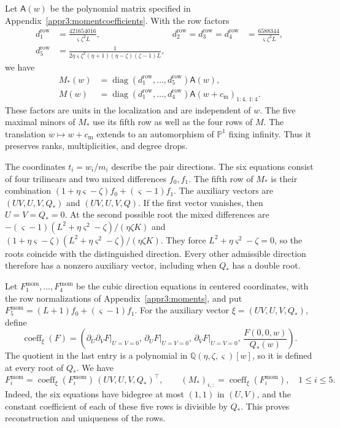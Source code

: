 \documentclass[11pt,a4paper]{article}
\numberwithin{equation}{section}
\theoremstyle{plain}
\theoremstyle{definition}
\theoremstyle{remark}
\begin{document}
Let $\mathsf A(w)$ be the polynomial matrix specified in
Appendix~\ref{appr3:momentcoefficients}. With the row factors
\begin{align*}
 d_{1}^{\mathrm{row}}&=\frac{421654016}{\varsigma \zeta ^2L},&
 d_{2}^{\mathrm{row}}=d_{3}^{\mathrm{row}}=d_{4}^{\mathrm{row}}&=\frac{6588344}{\varsigma \zeta ^2L},\\
 d_{5}^{\mathrm{row}}&=\frac{1}{2\eta \varsigma \zeta ^2(\eta +1)(\eta -\zeta )(\zeta -1)L},
\end{align*}
we have
\[
\begin{aligned}
 M_*(w)&=\operatorname{diag}(d_{1}^{\mathrm{row}},\ldots,d_{5}^{\mathrm{row}})\mathsf A(w),\\
 M(w)&=\operatorname{diag}(d_{1}^{\mathrm{row}},\ldots,d_{4}^{\mathrm{row}})\mathsf A(w+c_{\mathrm m})_{1:4,\,1:4}.
\end{aligned}
\]
These factors are units in the localization and are independent of
$w$. The five maximal minors of $M_*$ use its fifth row as well as
the four rows of $M$.
The translation $w\mapsto w+c_{\mathrm m}$ extends to an automorphism of
$\mathbb P^1$ fixing infinity. Thus it preserves ranks, multiplicities,
and degree drops.

The coordinates $t_i=w_i/m_i$ describe the pair directions.
The six equations consist of four trilinears and two mixed differences
$f_0,f_1$. The fifth row of $M_*$ is their combination
$(1+\eta\varsigma-\zeta)f_0+(\varsigma-1)f_1$.
The auxiliary vectors are $(UV,U,V,Q_*)$ and $(UV,U,V,Q)$.
If the first vector vanishes, then $U=V=Q_*=0$.
At the second possible root the mixed differences are
$-(\varsigma-1)(L^2+\eta\varsigma^2-\zeta)/(\eta\zeta K)$ and
$(1+\eta\varsigma-\zeta)(L^2+\eta\varsigma^2-\zeta)/(\eta\zeta K)$.
They force $L^2+\eta\varsigma^2-\zeta=0$, so the roots coincide with the distinguished direction.
Every other admissible direction therefore has a nonzero auxiliary vector,
including when $Q_*$ has a double root.

Let $F_1^{\mathrm{mom}},\ldots,F_4^{\mathrm{mom}}$ be the cubic direction equations in centered
coordinates, with the row normalizations of Appendix~\ref{appr3:moments},
and put $F_5^{\mathrm{mom}}=(L+1)f_0+(\varsigma-1)f_1$.
For the auxiliary vector $\xi=(UV,U,V,Q_*)$, define
\begin{equation}\label{r3:momentextraction}
 \operatorname{coeff}_{\xi}(F)=\left(
 \left.\partial_U\partial_VF\right|_{U=V=0},\,
 \left.\partial_UF\right|_{U=V=0},\,
 \left.\partial_VF\right|_{U=V=0},\,
 \frac{F(0,0,w)}{Q_*(w)}\right).
\end{equation}
The quotient in the last entry is a polynomial in
$\mathbb Q(\eta,\zeta,\varsigma)[w]$, so it is defined at every root of
$Q_*$. We have
\begin{equation}\label{r3:momentreconstruction}
 F_i^{\mathrm{mom}}=\operatorname{coeff}_{\xi}(F_i^{\mathrm{mom}})\,(UV,U,V,Q_*)^{\top},
 \qquad (M_*)_{i,:}=\operatorname{coeff}_{\xi}(F_i^{\mathrm{mom}}),\quad 1\le i\le5.
\end{equation}
Indeed, the six equations have bidegree at most $(1,1)$ in $(U,V)$,
and the constant coefficient of each of these five rows is divisible
by $Q_*$. This proves reconstruction and uniqueness of the rows.
\end{document}
